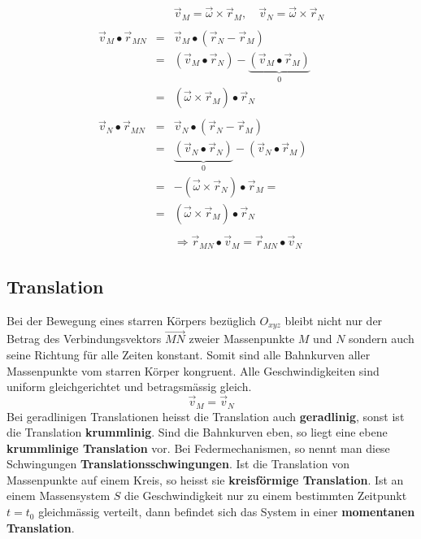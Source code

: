 \begin{equation}
\boxed{\begin{array}{lll}
&&\overrightarrow{v}_M=\overrightarrow{\omega}\times \overrightarrow{r}_M,\quad \overrightarrow{v}_N=\overrightarrow{\omega}\times \overrightarrow{r}_N\\\\
\overrightarrow{v}_M\bullet \overrightarrow{r}_{MN}&=&\overrightarrow{v}_M\bullet \left(\overrightarrow{r}_N-\overrightarrow{r}_M\right)\\
&=&\left(\overrightarrow{v}_M\bullet \overrightarrow{r}_N\right)-\underbrace{\left(\overrightarrow{v}_M\bullet \overrightarrow{r}_M\right)}_{0}\\
&=&\left(\overrightarrow{\omega}\times \overrightarrow{r}_M\right)\bullet \overrightarrow{r}_N\\\\
\overrightarrow{v}_N\bullet \overrightarrow{r}_{MN}&=&\overrightarrow{v}_N\bullet \left(\overrightarrow{r}_N-\overrightarrow{r}_M\right)\\
&=&\underbrace{\left(\overrightarrow{v}_N\bullet \overrightarrow{r}_N\right)}_{0}-\left(\overrightarrow{v}_N\bullet \overrightarrow{r}_M\right)\\
&=&-\left(\overrightarrow{\omega}\times \overrightarrow{r}_N\right)\bullet \overrightarrow{r}_M=\\
&=&\left(\overrightarrow{\omega}\times \overrightarrow{r}_M\right)\bullet \overrightarrow{r}_N\\\\
&&\Longrightarrow\overrightarrow{r}_{MN}\bullet \overrightarrow{v}_M=\overrightarrow{r}_{MN}\bullet\overrightarrow{v}_N
\end{array}}
\end{equation}
\subsection{Translation}
Bei der Bewegung eines starren Körpers bezüglich $O_{xyz}$ bleibt nicht nur der Betrag des Verbindungsvektors $\overrightarrow{MN}$ zweier Massenpunkte $M$ und $N$ sondern auch seine Richtung für alle Zeiten konstant. Somit sind alle Bahnkurven aller Massenpunkte vom starren Körper kongruent. Alle Geschwindigkeiten sind uniform gleichgerichtet und betragsmässig gleich.
\begin{equation}
\boxed{\overrightarrow{v}_M=\overrightarrow{v}_N}
\end{equation}
Bei geradlinigen Translationen heisst die Translation auch \textbf{geradlinig}, sonst ist die Translation \textbf{krummlinig}. Sind die Bahnkurven eben, so liegt eine ebene \textbf{krummlinige Translation} vor. Bei Federmechanismen, so nennt man diese Schwingungen \textbf{Translationsschwingungen}. Ist die Translation von Massenpunkte auf einem Kreis, so heisst sie \textbf{kreisförmige Translation}. Ist an einem Massensystem $S$ die Geschwindigkeit nur zu einem bestimmten Zeitpunkt $t=t_0$ gleichmässig verteilt, dann befindet sich das System in einer \textbf{momentanen Translation}.
